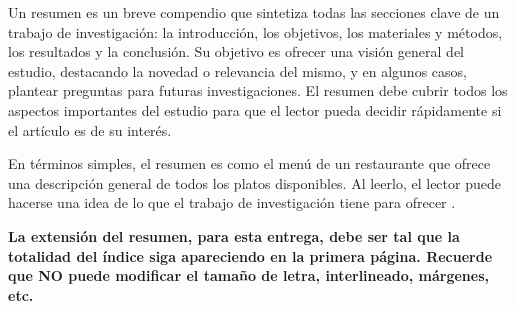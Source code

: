 Un resumen es un breve compendio que sintetiza todas las secciones clave de un trabajo de investigación: la introducción, los objetivos, los materiales y métodos, los resultados y la conclusión. Su objetivo es ofrecer una visión general del estudio, destacando la novedad o relevancia del mismo, y en algunos casos, plantear preguntas para futuras investigaciones. El resumen debe cubrir todos los aspectos importantes del estudio para que el lector pueda decidir rápidamente si el artículo es de su interés.

En términos simples, el resumen es como el menú de un restaurante que ofrece una descripción general de todos los platos disponibles. Al leerlo, el lector puede hacerse una idea de lo que el trabajo de investigación tiene para ofrecer \cite{elsevier_abstract_2024}.

\textbf{La extensión del resumen, para esta entrega, debe ser tal que la totalidad del índice siga apareciendo en la primera página. Recuerde que NO puede modificar el tamaño de letra, interlineado, márgenes, etc.}
